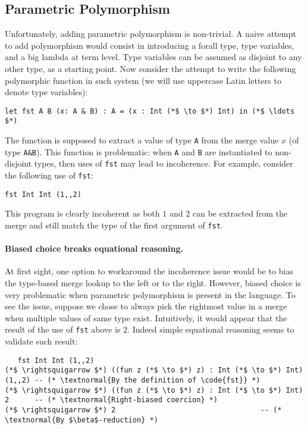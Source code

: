 \subsection{Parametric Polymorphism}
Unfortunately, adding parametric polymorphism is non-trivial.
A naive attempt to add polymorphism would consist in introducing a forall type, type variables, and a 
big lambda at term level.
Type variables can be assumed as disjoint to any other type, as a starting point.
Now consider the attempt to write the following polymorphic function in such system (we will use
uppercase Latin letters to denote type variables): 
\begin{lstlisting}
let fst A B (x: A & B) : A = (x : Int (*$ \to $*) Int) in (*$ \ldots $*)
\end{lstlisting}
The  function is supposed to extract a value of type
\lstinline{A} from the merge value $x$ (of type \lstinline{A&B}). 
This function is problematic: when
\lstinline{A} and \lstinline{B} are instantiated to non-disjoint
types, then uses of \lstinline{fst} may lead to incoherence.
For example, consider the following use of \lstinline{fst}:
\begin{lstlisting}
fst Int Int (1,,2)
\end{lstlisting}
\noindent This program is clearly incoherent as both
$1$ and $2$ can be extracted from the merge and still match the type
of the first argument of \lstinline{fst}.

\paragraph{Biased choice breaks equational reasoning.} 
At first sight, one option
to workaround the incoherence issue would be to bias the type-based merge lookup
to the left or to the right. %
However, biased choice is
very problematic when parametric polymorphism is present in the language.
To see the issue, suppose we chose to always pick the
rightmost value in a merge when multiple values of same type exist.
Intuitively, it would appear that the result of the use of
\lstinline{fst} above is $2$. 
Indeed simple equational reasoning seems to validate such result:
\begin{lstlisting}
   fst Int Int (1,,2)
(*$ \rightsquigarrow $*) ((fun z (*$ \to $*) z) : Int (*$ \to $*) Int) (1,,2) -- (* \textnormal{By the definition of \code{fst}} *)
(*$ \rightsquigarrow $*) ((fun z (*$ \to $*) z) : Int (*$ \to $*) Int) 2      -- (* \textnormal{Right-biased coercion} *)
(*$ \rightsquigarrow $*) 2                                  -- (* \textnormal{By $\beta$-reduction} *)
\end{lstlisting}

